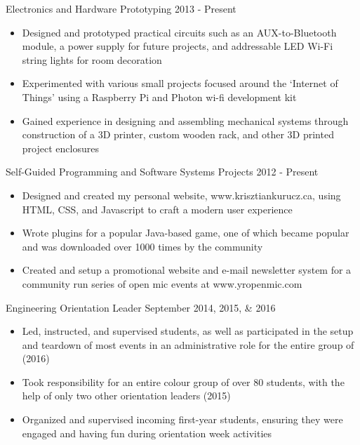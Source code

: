 \documentclass[hidelinks]{kkurucz-cv}
\begin{document}
\begin{entrylist}
\entry
{\vspace{-8mm}\null}
{Electronics and Hardware Prototyping}
{2013 - Present}
{
\vspace{-4mm}
\begin{itemize}
	\item Designed and prototyped practical circuits such as an AUX-to-Bluetooth module, a power supply for future projects, and addressable LED Wi-Fi string lights for room decoration
	\item Experimented with various small projects focused around the ‘Internet of Things’ using a Raspberry Pi and Photon wi-fi development kit
	\item Gained experience in designing and assembling mechanical systems through construction of a 3D printer, custom wooden rack, and other 3D printed project enclosures
\end{itemize}
}
{\null}
\entry
{\vspace{-8mm}\null}
{Self-Guided Programming and Software Systems Projects}
{2012 - Present}
{
\vspace{-4mm}
\begin{itemize}
	\item Designed and created my personal website, www.krisztiankurucz.ca, using HTML, CSS, and Javascript to craft a modern user experience
	\item Wrote plugins for a popular Java-based game, one of which became popular and was downloaded over 1000 times by the community
	\item Created and setup a promotional website and e-mail newsletter system for a community run series of open mic events at www.yropenmic.com
\end{itemize}
}
{\null}
\entry
{\vspace{-8mm}\null}
{Engineering Orientation Leader}
{September 2014, 2015, \& 2016}
{
\vspace{-4mm}
\begin{itemize}
	\item Led, instructed, and supervised students, as well as participated in the setup and teardown of most events in an administrative role for the entire group of (2016)
	\item Took responsibility for an entire colour group of over 80 students, with the help of only two other orientation leaders (2015)
	\item Organized and supervised incoming first-year students, ensuring they were engaged and having fun during orientation week activities
	\end{itemize}
}
{\null}
\end{entrylist}
\end{document}
